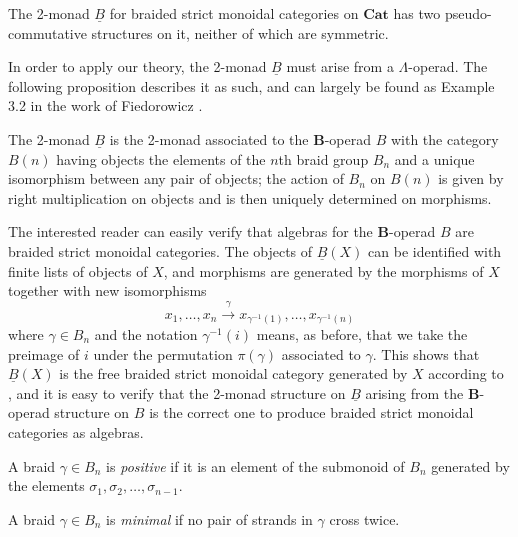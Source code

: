 \documentclass{amsbook} %
\newcommand{\mb}{\mathbf}
\numberwithin{section}{chapter}
\begin{document}
\begin{thm}\label{braidpscomm}
The 2-monad $\underline{B}$ for braided strict monoidal categories on $\mb{Cat}$ has two pseudo-commutative structures on it, neither of which are symmetric.
\end{thm}

In order to apply our theory, the 2-monad $\underline{B}$ must arise from a $\Lambda$-operad.  The following proposition describes it as such, and can largely be found as Example 3.2 in the work of Fiedorowicz \cite{fie-br}.

\begin{prop}
The 2-monad $\underline{B}$ is the 2-monad associated to the $\mb{B}$-operad $B$ with the category $B(n)$ having objects the elements of the $n$th braid group $B_{n}$ and a unique isomorphism between any pair of objects; the action of $B_{n}$ on $B(n)$ is given by right multiplication on objects and is then uniquely determined on morphisms.
\end{prop}

The interested reader can easily verify that algebras for the $\mb{B}$-operad $B$ are braided strict monoidal categories.  The objects of $\underline{B}(X)$ can be identified with finite lists of objects of $X$, and morphisms are generated by the morphisms of $X$ together with new isomorphisms
\[
x_{1}, \ldots, x_{n} \stackrel{\gamma}{\longrightarrow} x_{\gamma^{-1}(1)}, \ldots, x_{\gamma^{-1}(n)}
\]
where $\gamma \in B_{n}$ and the notation $\gamma^{-1}(i)$ means, as before, that we take the preimage of $i$ under the permutation $\pi(\gamma)$ associated to $\gamma$.  This shows that $\underline{B}(X)$ is the free braided strict monoidal category generated by $X$ according to \cite{js}, and it is easy to verify that the 2-monad structure on $\underline{B}$ arising from the $\mb{B}$-operad structure on $B$ is the correct one to produce braided strict monoidal categories as algebras.



\begin{Defi}
A braid $\gamma \in B_{n}$ is \textit{positive} if it is an element of the submonoid of $B_{n}$ generated by the elements $\sigma_{1}, \sigma_{2}, \ldots, \sigma_{n-1}$.
\end{Defi}

\begin{Defi}
 A braid $\gamma \in B_{n}$ is \textit{minimal} if no pair of strands in $\gamma$ cross twice.
\end{Defi}
\end{document}
